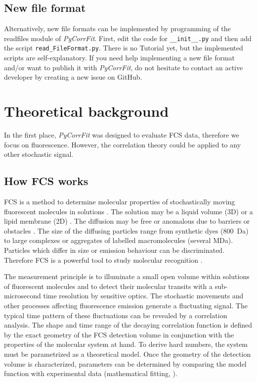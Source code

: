 \subsection{New file format}
Alternatively, new file formats can be implemented by programming of the readfiles module of \textit{PyCorrFit}. First, edit the code for \texttt{\_\_init\_\_.py} and then add the script \texttt{read\_FileFormat.py}.
There is no Tutorial yet, but the implemented scripts are self-explanatory. If you need help implementing a new file format and/or want to publish it with \textit{PyCorrFit}, do not hesitate to contact an active developer by creating a new issue on GitHub.

\section{Theoretical background}
\label{sec:theor}
In the first place, \textit{PyCorrFit} was designed to evaluate FCS data, therefore we focus on fluorescence. However, the correlation theory could be applied to any other stochastic signal.

\subsection{How FCS works}
\label{sec:theor.howfc}

FCS is a method to determine molecular properties of stochastically moving fluorescent molecules in solutions \cite{Elson1974,Magde1974,Magde1978}. The solution may be a liquid volume (3D) or a lipid membrane (2D) \cite{Widengren1998,Korlach1999,Schwille1999}. The diffusion may be free or anomalous due to barriers or obstacles \cite{Wachsmuth2000,Weiss2003}. The size of the diffusing particles range from synthetic dyes (\SI{800}{Da}) to large complexes or aggregates of labelled macromolecules (several MDa). Particles which differ in size or emission behaviour can be discriminated. Therefore FCS is a powerful tool to study molecular recognition \cite{Bacia2006,Kim2007}.

The measurement principle is to illuminate a small open volume within solutions of fluorescent molecules and to detect their molecular transits with a sub-microsecond time resolution by sensitive optics. The stochastic movements and other processes affecting fluorescence emission generate a fluctuating signal. The typical time pattern of these fluctuations can be revealed by a correlation analysis. The shape and time range of the decaying correlation function is defined by the exact geometry of the FCS detection volume in conjunction with the properties of the molecular system at hand. To derive hard numbers, the system must be parametrized as a theoretical model. Once the geometry of the detection volume is characterized, parameters can be determined by comparing the model function with experimental data (mathematical fitting, ).

